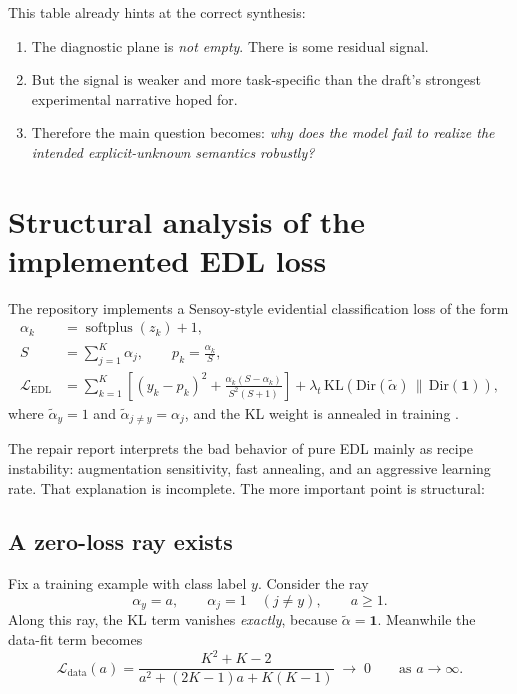 \documentclass[11pt]{article}
\begin{document}
This table already hints at the correct synthesis:

\begin{enumerate}[leftmargin=1.5em]
  \item The diagnostic plane is \emph{not empty}. There is some residual signal.
  \item But the signal is weaker and more task-specific than the draft's strongest experimental narrative hoped for.
  \item Therefore the main question becomes: \emph{why does the model fail to realize the intended explicit-unknown semantics robustly?}
\end{enumerate}

\section{Structural analysis of the implemented EDL loss}

The repository implements a Sensoy-style evidential classification loss of the form
\begin{align}
\alpha_k &= \operatorname{softplus}(z_k) + 1, \\
S &= \sum_{j=1}^K \alpha_j, \qquad p_k = \frac{\alpha_k}{S}, \\
\mathcal{L}_{\mathrm{EDL}} &= \sum_{k=1}^K \left[(y_k-p_k)^2 + \frac{\alpha_k(S-\alpha_k)}{S^2(S+1)}\right]
+ \lambda_t \, \mathrm{KL}\!\left(\mathrm{Dir}(\tilde{\alpha}) \,\|\, \mathrm{Dir}(\mathbf{1})\right),
\end{align}
where $\tilde{\alpha}_y=1$ and $\tilde{\alpha}_{j\neq y}=\alpha_j$, and the KL weight is annealed in training \cite{utils,train}.

The repair report interprets the bad behavior of pure EDL mainly as recipe instability: augmentation sensitivity, fast annealing, and an aggressive learning rate. That explanation is incomplete. The more important point is structural:

\subsection*{A zero-loss ray exists}

Fix a training example with class label $y$. Consider the ray
\[
\alpha_y = a, \qquad \alpha_j = 1 \quad (j\neq y), \qquad a\ge 1.
\]
Along this ray, the KL term vanishes \emph{exactly}, because $\tilde{\alpha}=\mathbf{1}$. Meanwhile the data-fit term becomes
\[
\mathcal{L}_{\mathrm{data}}(a)
= \frac{K^2+K-2}{a^2 + (2K-1)a + K(K-1)}
\;\longrightarrow\; 0
\qquad \text{as } a\to\infty.
\]
\end{document}
